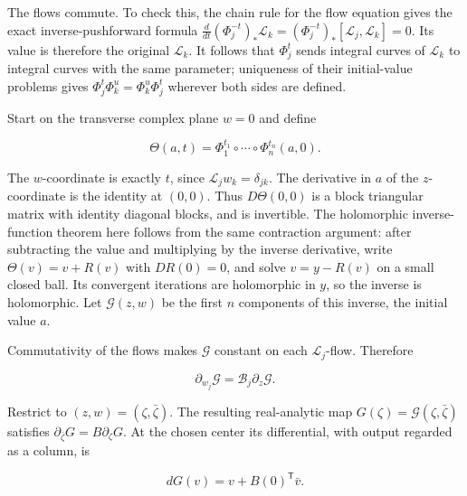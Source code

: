 The flows commute. To check this, the chain rule for the flow equation gives the exact inverse-pushforward formula \(\frac{d}{dt}(\Phi_j^{-t})_*\mathcal L_k=(\Phi_j^{-t})_*[\mathcal L_j,\mathcal L_k]=0\). Its value is therefore the original \(\mathcal L_k\). It follows that \(\Phi_j^t\) sends integral curves of \(\mathcal L_k\) to integral curves with the same parameter; uniqueness of their initial-value problems gives \(\Phi_j^t\Phi_k^u=\Phi_k^u\Phi_j^t\) wherever both sides are defined.

Start on the transverse complex plane \(w=0\) and define

\begin{equation}
\Theta(a,t)=\Phi_1^{t_1}\circ\cdots\circ\Phi_n^{t_n}(a,0).
\label{courseIII:almost-complex-structures-and-integrability:eq:9.2}
\end{equation}

The \(w\)-coordinate is exactly \(t\), since \(\mathcal L_jw_k=\delta_{jk}\). The derivative in \(a\) of the \(z\)-coordinate is the identity at \((0,0)\). Thus \(D\Theta(0,0)\) is a block triangular matrix with identity diagonal blocks, and is invertible. The holomorphic inverse-function theorem here follows from the same contraction argument: after subtracting the value and multiplying by the inverse derivative, write \(\Theta(v)=v+R(v)\) with \(DR(0)=0\), and solve \(v=y-R(v)\) on a small closed ball. Its convergent iterations are holomorphic in \(y\), so the inverse is holomorphic. Let \(\mathcal G(z,w)\) be the first \(n\) components of this inverse, the initial value \(a\).

Commutativity of the flows makes \(\mathcal G\) constant on each \(\mathcal L_j\)-flow. Therefore

\begin{equation}
\partial_{w_j}\mathcal G
=\mathcal B_j\partial_z\mathcal G.
\label{courseIII:almost-complex-structures-and-integrability:eq:9.3}
\end{equation}

Restrict to \((z,w)=(\zeta,\bar\zeta)\). The resulting real-analytic map \(G(\zeta)=\mathcal G(\zeta,\bar\zeta)\) satisfies
\(\partial_{\bar\zeta}G=B\partial_\zeta G\).
At the chosen center its differential, with output regarded as a column, is

\begin{equation}
dG(v)=v+B(0)^{\mathsf T}\bar v.
\label{courseIII:almost-complex-structures-and-integrability:eq:9.4}
\end{equation}

